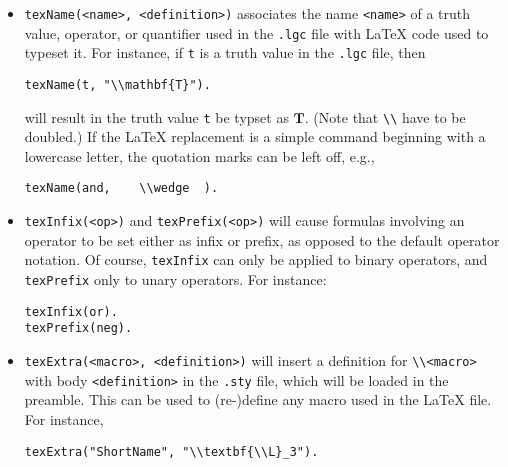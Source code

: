 \documentclass[
]{article}
\newcommand{\passthrough}[1]{#1}
\begin{document}
\begin{itemize}
\item
  \passthrough{\lstinline!texName(<name>, <definition>)!} associates the
  name \passthrough{\lstinline!<name>!} of a truth value, operator, or
  quantifier used in the \passthrough{\lstinline!.lgc!} file with LaTeX
  code used to typeset it. For instance, if \passthrough{\lstinline!t!}
  is a truth value in the \passthrough{\lstinline!.lgc!} file, then

\begin{lstlisting}
texName(t, "\\mathbf{T}").
\end{lstlisting}

  will result in the truth value \passthrough{\lstinline!t!} be typset
  as \(\mathbf{T}\). (Note that \passthrough{\lstinline!\\!} have to be
  doubled.) If the LaTeX replacement is a simple command beginning with
  a lowercase letter, the quotation marks can be left off, e.g.,

\begin{lstlisting}
texName(and,    \\wedge  ).
\end{lstlisting}
\item
  \passthrough{\lstinline!texInfix(<op>)!} and
  \passthrough{\lstinline!texPrefix(<op>)!} will cause formulas
  involving an operator to be set either as infix or prefix, as opposed
  to the default operator notation. Of course,
  \passthrough{\lstinline!texInfix!} can only be applied to binary
  operators, and \passthrough{\lstinline!texPrefix!} only to unary
  operators. For instance:

\begin{lstlisting}
texInfix(or).
texPrefix(neg).
\end{lstlisting}
\item
  \passthrough{\lstinline!texExtra(<macro>, <definition>)!} will insert
  a definition for \passthrough{\lstinline!\\<macro>!} with body
  \passthrough{\lstinline!<definition>!} in the
  \passthrough{\lstinline!.sty!} file, which will be loaded in the
  preamble. This can be used to (re-)define any macro used in the LaTeX
  file. For instance,

\begin{lstlisting}
texExtra("ShortName", "\\textbf{\\L}_3").
\end{lstlisting}


\end{itemize}
\end{document}
